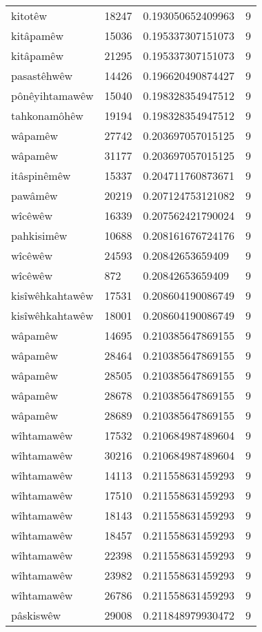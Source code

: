 \begin{longtable}{llll}
kitotêw & 18247 & 0.193050652409963 & 9\\
kitâpamêw & 15036 & 0.195337307151073 & 9\\
kitâpamêw & 21295 & 0.195337307151073 & 9\\
pasastêhwêw & 14426 & 0.196620490874427 & 9\\
pônêyihtamawêw & 15040 & 0.198328354947512 & 9\\
tahkonamôhêw & 19194 & 0.198328354947512 & 9\\
wâpamêw & 27742 & 0.203697057015125 & 9\\
wâpamêw & 31177 & 0.203697057015125 & 9\\
itâspinêmêw & 15337 & 0.204711760873671 & 9\\
pawâmêw & 20219 & 0.207124753121082 & 9\\
wîcêwêw & 16339 & 0.207562421790024 & 9\\
pahkisimêw & 10688 & 0.208161676724176 & 9\\
wîcêwêw & 24593 & 0.20842653659409 & 9\\
wîcêwêw & 872 & 0.20842653659409 & 9\\
kisîwêhkahtawêw & 17531 & 0.208604190086749 & 9\\
kisîwêhkahtawêw & 18001 & 0.208604190086749 & 9\\
wâpamêw & 14695 & 0.210385647869155 & 9\\
wâpamêw & 28464 & 0.210385647869155 & 9\\
wâpamêw & 28505 & 0.210385647869155 & 9\\
wâpamêw & 28678 & 0.210385647869155 & 9\\
wâpamêw & 28689 & 0.210385647869155 & 9\\
wîhtamawêw & 17532 & 0.210684987489604 & 9\\
wîhtamawêw & 30216 & 0.210684987489604 & 9\\
wîhtamawêw & 14113 & 0.211558631459293 & 9\\
wîhtamawêw & 17510 & 0.211558631459293 & 9\\
wîhtamawêw & 18143 & 0.211558631459293 & 9\\
wîhtamawêw & 18457 & 0.211558631459293 & 9\\
wîhtamawêw & 22398 & 0.211558631459293 & 9\\
wîhtamawêw & 23982 & 0.211558631459293 & 9\\
wîhtamawêw & 26786 & 0.211558631459293 & 9\\
pâskiswêw & 29008 & 0.211848979930472 & 9\\

\end{longtable}
